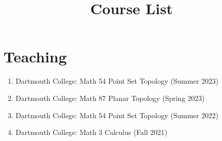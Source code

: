 \documentclass[a4paper,sans]{moderncv}
\title{Course List}
\begin{document}
    \makecvtitle
    \vspace{-8ex}
    \section{Teaching}
        \begin{enumerate}
            \item
                Dartmouth College:
                Math 54 Point Set Topology (Summer 2023)
            \item
                Dartmouth College:
                Math 87 Planar Topology (Spring 2023)
            \item
                Dartmouth College:
                Math 54 Point Set Topology (Summer 2022)
            \item
                Dartmouth College:
                Math 3 Calculus (Fall 2021)
        \end{enumerate}
\end{document}
